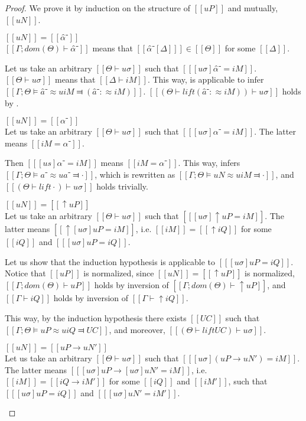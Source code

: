 \begin{proof}
    We prove it by induction on the structure of $[[uP]]$ and mutually, $[[uN]]$.
    \begin{caseof}
        \item $[[uN]] = [[α̂⁻]]$\\
            $[[Γ ; dom(Θ) ⊢  α̂⁻]]$ means that $[[ α̂⁻[Δ] ]] \in [[Θ]]$ for some $[[Δ]]$.

            Let us take an arbitrary $[[Θ ⊢ uσ]]$ such that $[[ [uσ]α̂⁻ = iM ]]$.
            $[[Θ ⊢ uσ]]$ means that $[[Δ ⊢ iM]]$.
            This way,  is applicable to infer 
            $[[Γ ; Θ ⊨ â⁻ ≈u iM ⫤ (â⁻ :≈ iM)]]$.
            $[[(Θ  ⊢  lift (â⁻ :≈ iM)) ⊢ uσ]]$ holds by . 
            
        \item $[[uN]] = [[α⁻]]$\\
            Let us take an arbitrary $[[Θ ⊢ uσ]]$ such that $[[ [uσ]α⁻ = iM ]]$.
            The latter means $[[iM = α⁻]]$.

            Then $[[ [us]α⁻ = iM ]]$ means $[[iM = α⁻]]$.
            This way,  infers 
            $[[Γ; Θ ⊨ a⁻ ≈u a⁻ ⫤ ·]]$, which is rewritten as $[[Γ; Θ ⊨ uN ≈u iM ⫤ ·]]$, 
            and $[[(Θ  ⊢  lift ·) ⊢ uσ]]$ holds trivially.

        \item $[[uN]] = [[↑uP]]$\\
            Let us take an arbitrary $[[Θ ⊢ uσ]]$ such that $[[ [uσ]↑uP = iM ]]$.
            The latter means $[[ ↑[uσ]uP = iM ]]$, i.e.
            $[[iM]] = [[↑iQ]]$ for some $[[iQ]]$ and $[[ [uσ]uP = iQ ]]$.

            Let us show that the induction hypothesis is applicable to $[[ [uσ]uP = iQ ]]$.
            Notice that $[[uP]]$ is normalized, since $[[uN]] = [[↑uP]]$ is normalized,
            $[[Γ ; dom(Θ) ⊢  uP]]$ holds by inversion of $[[Γ ; dom(Θ) ⊢  ↑uP]]$, 
            and $[[Γ ⊢ iQ]]$ holds by inversion of $[[Γ ⊢ ↑iQ]]$.

            This way, by the induction hypothesis there exists $[[UC]]$ such that
            $[[Γ ; Θ ⊨ uP ≈u iQ ⫤ UC]]$, and moreover, $[[(Θ  ⊢  lift UC) ⊢ uσ]]$.
            
        \item $[[uN]] = [[uP → uN']]$\\
            Let us take an arbitrary $[[Θ ⊢ uσ]]$ such that $[[ [uσ](uP → uN') = iM ]]$.
            The latter means $[[ [uσ]uP → [uσ]uN' = iM ]]$, i.e.
            $[[iM]] = [[iQ → iM']]$ for some $[[iQ]]$ and $[[iM']]$, 
            such that $[[ [uσ]uP = iQ ]]$ and $[[ [uσ]uN' = iM' ]]$.


\end{caseof}
\end{proof}
